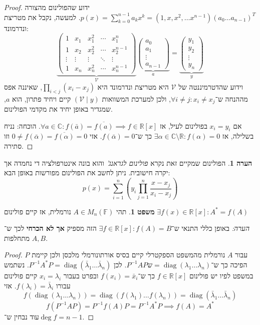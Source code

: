 \documentclass[a4paper]{article}
\newcommand\R     {\mathbb{R}}
\newcommand\C     {\mathbb{C}}
\newcommand\vc    {\mathcal{V}} %
\newcommand\ol    {\overline}
\DeclareMathOperator{\diag}    {diag}
\newcommand\F         {\mathbb{F}}
\newcommand\co        {\colon}
\newcommand\pms[1]    {\begin{pmatrix}
		#1
\end{pmatrix}}
\newcommand\ag        {\alpha}
\renewcommand\lg      {\lambda}
\newcommand\op    {^{-1}}
\newcommand\cl [1]    {\left ( #1 \right )}
\theoremstyle{definition}
\newtheorem{Theorem}{\color{myblue}משפט}
\newtheorem{Remark}{\color{mycyan}הערה}
\newcommand\theo  [1] {\begin{Theorem}#1\end{Theorem}}
\newcommand\rmark [1] {\begin{Remark}#1\end{Remark}}
\begin{document}
	\begin{proof}
		ידוע שהפולינום מהצורה $p(x)  = \sum_{k = 0}^{n - 1} a_k x^k  = (1, x, x^2, \dots x^{n - 1}) (a_0 \dots a_{n - 1})^T$. למעשה, נקבל את מטריצת ונדרמונד: 
		\[ \underbrace{\pms{1 & x_1 & x_1^2 & \cdots & x_1^n \\ 1 & x_2 & x_2^2 & \cdots & x_2^{n - 1} \\ \vdots & \vdots & \vdots & \ddots & \vdots \\ 1 & x_n & x_n^2 & \cdots & x_n^{n - 1}}}_{\vc}\underbrace{\pms{a_0 \\ a_1 \\ \vdots \\ a_{n - 1}}}_{a} = \underbrace{\pms{y_1 \\ y_2 \\ \vdots \\ y_n}}_{y} \]
		וידוע שהדטרמיננטה של $\vc$ היא מטריצת ונדרמונד היא $\prod_{i < j} (x_i - x_j)$, שאיננה אפס מההנחה ש־$\forall i \neq j \co x_i \neq x_j$, ולכן למערכת המשוואות $(\vc \mid y)$ קיים ויחיד פתרון, הוא $a$, שמגדיר באופן יחיד את מקדמי הפולינום. 
		
		אם $x_i = y_i$ בפולינום לעיל, אז $\forall a \in \C \co f(\bar a) = \ol{f(a)} \implies f \in \R[x]$. הוכחה: נניח בשלילה, אז $\exists \ag \in \C\setminus \R \co f(\ag) = 0$ כך ש־$f(\bar \ag) = 0$. אזי $0 \neq f(\bar \ag) = \ol{f(\ag)}  = 0$ וזו סתירה. 
	\end{proof}
	
	\rmark{הפולינום שמקיים זאת נקרא \textit{פולינום לגראנג'} והוא בונה אינטרפולציה די נחמדה אך יקרה חישובית. ניתן לחשב את הפולינום מפורשות באופן הבא: 
	\[ p(x) = \sum_{i = 1}^{n}\cl{y_i \prod_{j = 1}^{n}\frac{x - x_j}{x_i - x_j}} \]}
	
	\theo{תהי $A \in M_n(\F)$ נורמלית, אז קיים פולינום $\exists f(x) \in \R[x] \co A^* = f(A)$}
	\textit{הערה: }באופן כללי התנאי ש־$\exists f \in \R[x] \co f(A) = B$ הזה מספיק \textbf{אך לא הכרחי} לכך ש־$A, B$ מתחלפות. 
	\begin{proof}
		עבור $A$ נורמלית מהמשפט הספקטרלי קיים בסיס אורתונורמלי מלכסן ולכן קיימת $P$ הפיכה כך ש־$P\op APש = \diag(\lg_1 \dots \lg_n)$. לכן $P\op A^* P = \diag(\bar \lg_1 \dots \bar \lg_n)$. נשתמש במשפט לפיו יש פולינום $f \in \R[x]$ כך ש־$f(x_i) = \bar x_i$ ובפרט בעבור $x_i = \lg_i$ קיים פולינום עבורו $f(\lg_i) = \bar \lg_i$. אזי 
		\[ f(\diag(\lg_1 \dots \lg_n)) = \diag(f(\lg_1) \dots f(\lg_n)) = \diag(\bar \lg_1 \dots \bar \lg_n) \]
		\[ f(P\op A P) = P\op f(A) P = P \op A^* P \implies f(A) = A^* \]
		עוד נבחין ש־$\deg f = n - 1$. 
	\end{proof}
	
\end{document}
